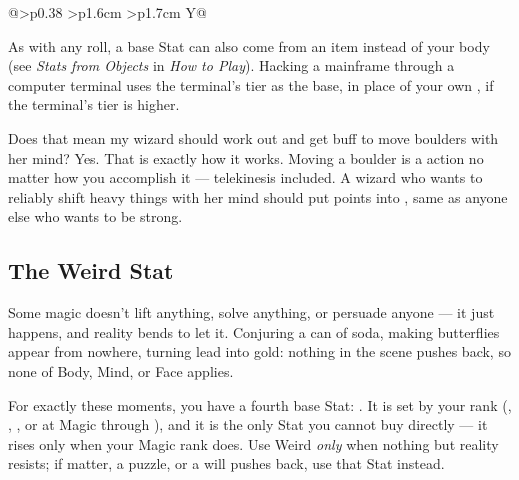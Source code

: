 \begin{table}[p]
\begin{tabularx}{\textwidth}{@{}>{\RaggedRight\arraybackslash}p{} >{\RaggedRight\arraybackslash}p{1.6cm} >{\RaggedRight\arraybackslash}p{1.7cm} Y@{}}
  \end{tabularx}
  \endgroup
\end{table}

As with any roll, a base Stat can also come from an item instead of your
body (see \emph{Stats from Objects} in \emph{How to Play}). Hacking a
mainframe through a computer terminal uses the terminal's tier as the
base, in place of your own , if the terminal's tier is
higher.

\begin{question}{Does that mean my wizard should work out and get buff to move boulders with her mind?}
Yes. That is exactly how it works. Moving a boulder is a 
action no matter how you accomplish it --- telekinesis included. A
wizard who wants to reliably shift heavy things with her mind should put
points into , same as anyone else who wants to be strong.
\end{question}

\subsection*{The Weird Stat}
Some magic doesn't lift anything, solve anything, or persuade anyone ---
it just happens, and reality bends to let it. Conjuring a can of soda,
making butterflies appear from nowhere, turning lead into gold: nothing in
the scene pushes back, so none of Body, Mind, or Face applies.

For exactly these moments, you have a fourth base Stat: .
It is set by your  rank (, , ,
or  at Magic  through ), and it is the only Stat
you cannot buy directly --- it rises only when your Magic rank does.
Use Weird \emph{only} when nothing but reality resists; if matter, a
puzzle, or a will pushes back, use that Stat instead.

